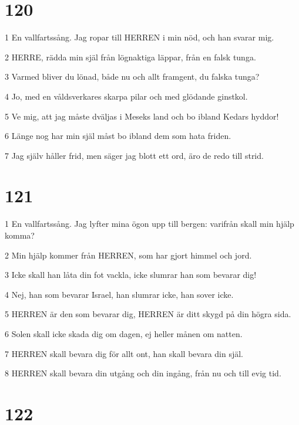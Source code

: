 \chapter{120}

\par 1 En vallfartssång. Jag ropar till HERREN i min nöd, och han svarar mig.
\par 2 HERRE, rädda min själ från lögnaktiga läppar, från en falsk tunga.
\par 3 Varmed bliver du lönad, både nu och allt framgent, du falska tunga?
\par 4 Jo, med en våldsverkares skarpa pilar och med glödande ginstkol.
\par 5 Ve mig, att jag måste dväljas i Meseks land och bo ibland Kedars hyddor!
\par 6 Länge nog har min själ måst bo ibland dem som hata friden.
\par 7 Jag själv håller frid, men säger jag blott ett ord, äro de redo till strid.

\chapter{121}

\par 1 En vallfartssång. Jag lyfter mina ögon upp till bergen: varifrån skall min hjälp komma?
\par 2 Min hjälp kommer från HERREN, som har gjort himmel och jord.
\par 3 Icke skall han låta din fot vackla, icke slumrar han som bevarar dig!
\par 4 Nej, han som bevarar Israel, han slumrar icke, han sover icke.
\par 5 HERREN är den som bevarar dig, HERREN är ditt skygd på din högra sida.
\par 6 Solen skall icke skada dig om dagen, ej heller månen om natten.
\par 7 HERREN skall bevara dig för allt ont, han skall bevara din själ.
\par 8 HERREN skall bevara din utgång och din ingång, från nu och till evig tid.

\chapter{122}

